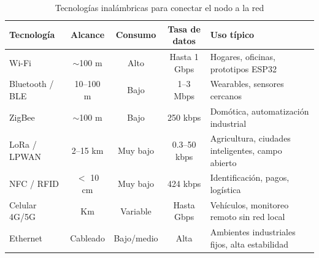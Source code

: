 \begin{table}[tp]

\centering
\renewcommand{\arraystretch}{1.3}
\label{tab:Tabla_4_PDCIoT}
\caption{Tecnologías inalámbricas para conectar el nodo a la red}
\begin{tabularx}{\textwidth}{|l|c|c|c|X|}
\hline
\textbf{Tecnología} & \textbf{Alcance} & \textbf{Consumo} & \textbf{Tasa de datos} & \textbf{Uso típico} \\
\hline
Wi-Fi & $\sim$100 m & Alto & Hasta 1 Gbps & Hogares, oficinas, prototipos ESP32 \\
\hline
Bluetooth / BLE & 10--100 m & Bajo & 1--3 Mbps & Wearables, sensores cercanos \\
\hline
ZigBee & $\sim$100 m & Bajo & 250 kbps & Domótica, automatización industrial \\
\hline
LoRa / LPWAN & 2--15 km & Muy bajo & 0.3--50 kbps & Agricultura, ciudades inteligentes, campo abierto \\
\hline
NFC / RFID & $<$ 10 cm & Muy bajo & 424 kbps & Identificación, pagos, logística \\
\hline
Celular 4G/5G & Km & Variable & Hasta Gbps & Vehículos, monitoreo remoto sin red local \\
\hline
Ethernet & Cableado & Bajo/medio & Alta & Ambientes industriales fijos, alta estabilidad \\
\hline
\end{tabularx}

\end{table}